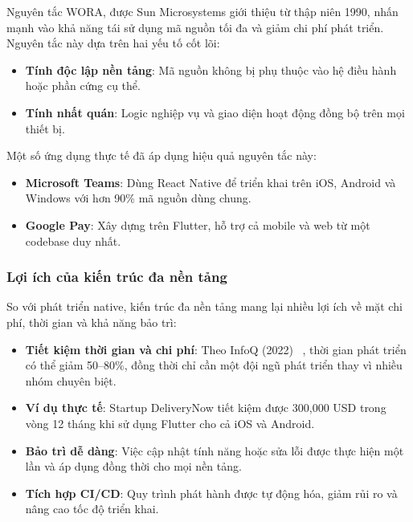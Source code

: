     Nguyên tắc WORA, được Sun Microsystems giới thiệu từ thập niên 1990, nhấn mạnh vào khả năng tái sử dụng mã nguồn tối đa và giảm chi phí phát triển. Nguyên tắc này dựa trên hai yếu tố cốt lõi:
    \setlength{\leftmargini}{1.5cm}
    \begin{itemize}
        \item \textbf{Tính độc lập nền tảng}: Mã nguồn không bị phụ thuộc vào hệ điều hành hoặc phần cứng cụ thể.
        \item \textbf{Tính nhất quán}: Logic nghiệp vụ và giao diện hoạt động đồng bộ trên mọi thiết bị.
    \end{itemize}
\vspace{0.5em}


    Một số ứng dụng thực tế đã áp dụng hiệu quả nguyên tắc này:
    \setlength{\leftmargini}{1.5cm}
    \begin{itemize}
        \item \textbf{Microsoft Teams}: Dùng React Native để triển khai trên iOS, Android và Windows với hơn 90\% mã nguồn dùng chung.
        \item \textbf{Google Pay}: Xây dựng trên Flutter, hỗ trợ cả mobile và web từ một codebase duy nhất.
    \end{itemize}

\subsubsection{Lợi ích của kiến trúc đa nền tảng}

    So với phát triển native, kiến trúc đa nền tảng mang lại nhiều lợi ích về mặt chi phí, thời gian và khả năng bảo trì:
    \setlength{\leftmargini}{1.5cm}
    \begin{itemize}
        \item \textbf{Tiết kiệm thời gian và chi phí}: Theo InfoQ (2022) ~\cite{infoq2022}, thời gian phát triển có thể giảm 50–80\%, đồng thời chỉ cần một đội ngũ phát triển thay vì nhiều nhóm chuyên biệt.
        \item \textbf{Ví dụ thực tế}: Startup DeliveryNow tiết kiệm được 300,000 USD trong vòng 12 tháng khi sử dụng Flutter cho cả iOS và Android.
        \item \textbf{Bảo trì dễ dàng}: Việc cập nhật tính năng hoặc sửa lỗi được thực hiện một lần và áp dụng đồng thời cho mọi nền tảng.
        \item \textbf{Tích hợp CI/CD}: Quy trình phát hành được tự động hóa, giảm rủi ro và nâng cao tốc độ triển khai.
    \end{itemize}

